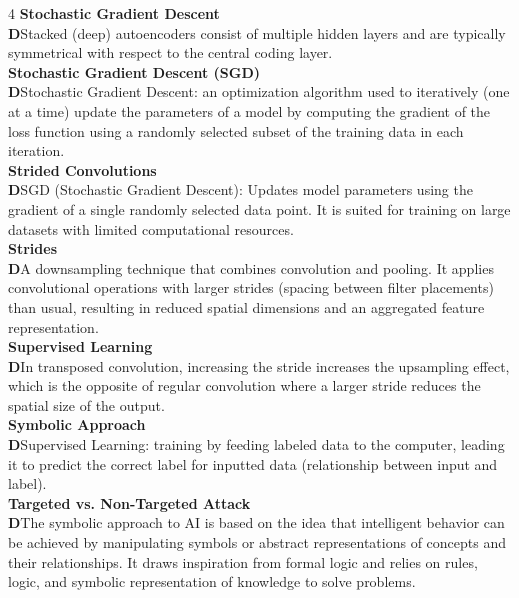 \documentclass[8pt]{extarticle}
\newcommand{\dtag}{\textcolor{definitioncolor}{\tiny\textbf{D}}\;}
\begin{document}
\begin{multicols}{4}
\vspace{2pt}\textbf{Stochastic Gradient Descent}\\
\dtag Stacked (deep) autoencoders consist of multiple hidden layers and are typically symmetrical with respect to the central coding layer.\\
\vspace{2pt}\textbf{Stochastic Gradient Descent (SGD)}\\
\dtag Stochastic Gradient Descent: an optimization algorithm used to iteratively (one at a time) update the parameters of a model by computing the gradient of the loss function using a randomly selected subset of the training data in each iteration.\\
\vspace{2pt}\textbf{Strided Convolutions}\\
\dtag SGD (Stochastic Gradient Descent): Updates model parameters using the gradient of a single randomly selected data point. It is suited for training on large datasets with limited computational resources.\\
\vspace{2pt}\textbf{Strides}\\
\dtag A downsampling technique that combines convolution and pooling. It applies convolutional operations with larger strides (spacing between filter placements) than usual, resulting in reduced spatial dimensions and an aggregated feature representation.\\
\vspace{2pt}\textbf{Supervised Learning}\\
\dtag In transposed convolution, increasing the stride increases the upsampling effect, which is the opposite of regular convolution where a larger stride reduces the spatial size of the output.\\
\vspace{2pt}\textbf{Symbolic Approach}\\
\dtag Supervised Learning: training by feeding labeled data to the computer, leading it to predict the correct label for inputted data (relationship between input and label).\\
\vspace{2pt}\textbf{Targeted vs. Non-Targeted Attack}\\
\dtag The symbolic approach to AI is based on the idea that intelligent behavior can be achieved by manipulating symbols or abstract representations of concepts and their relationships. It draws inspiration from formal logic and relies on rules, logic, and symbolic representation of knowledge to solve problems.\\

\end{multicols}
\end{document}
